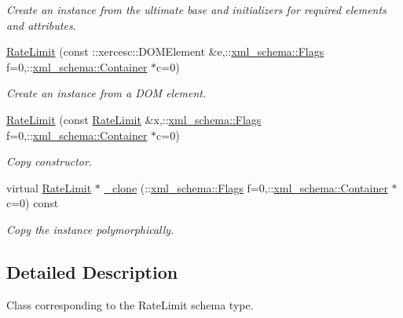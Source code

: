 \begin{DoxyCompactItemize}
\begin{DoxyCompactList}\small\item\em Create an instance from the ultimate base and initializers for required elements and attributes. \item\end{DoxyCompactList}\item 
\hyperlink{classopenstack_1_1xml_1_1RateLimit_a64f813e040e017ec9a4c5b303cfd6685}{RateLimit} (const ::xercesc::DOMElement \&e,::\hyperlink{namespacexml__schema_affb4c227cbd9aa7453dd1dc5a1401943}{xml\_\-schema::Flags} f=0,::\hyperlink{namespacexml__schema_a333dea2213742aea47a37532dec4ec27}{xml\_\-schema::Container} $\ast$c=0)
\begin{DoxyCompactList}\small\item\em Create an instance from a DOM element. \item\end{DoxyCompactList}\item 
\hyperlink{classopenstack_1_1xml_1_1RateLimit_a45985b51ae41ce6f14de1fdee3ce09ac}{RateLimit} (const \hyperlink{classopenstack_1_1xml_1_1RateLimit}{RateLimit} \&x,::\hyperlink{namespacexml__schema_affb4c227cbd9aa7453dd1dc5a1401943}{xml\_\-schema::Flags} f=0,::\hyperlink{namespacexml__schema_a333dea2213742aea47a37532dec4ec27}{xml\_\-schema::Container} $\ast$c=0)
\begin{DoxyCompactList}\small\item\em Copy constructor. \item\end{DoxyCompactList}\item 
virtual \hyperlink{classopenstack_1_1xml_1_1RateLimit}{RateLimit} $\ast$ \hyperlink{classopenstack_1_1xml_1_1RateLimit_ac8082112503072f3202bff203d97a6a0}{\_\-clone} (::\hyperlink{namespacexml__schema_affb4c227cbd9aa7453dd1dc5a1401943}{xml\_\-schema::Flags} f=0,::\hyperlink{namespacexml__schema_a333dea2213742aea47a37532dec4ec27}{xml\_\-schema::Container} $\ast$c=0) const 
\begin{DoxyCompactList}\small\item\em Copy the instance polymorphically. \item\end{DoxyCompactList}\end{DoxyCompactItemize}


\subsection{Detailed Description}
Class corresponding to the RateLimit schema type. 

